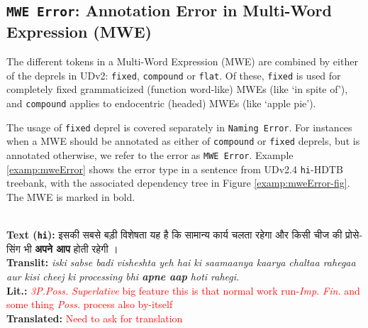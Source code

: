 \subsection[Annotation Error in Multi-Word Expression (MWE): \texttt{MWE Error}]{\texttt{MWE Error}: Annotation Error in Multi-Word Expression (MWE)}

The different tokens in a Multi-Word Expression (MWE) are combined by either of the deprels in UDv2: \texttt{fixed}, \texttt{compound} or \texttt{flat}. Of these, \texttt{fixed} is used for completely fixed grammaticized (function word-like) MWEs (like `in spite of'), and \texttt{compound} applies to endocentric (headed) MWEs (like `apple pie').

The usage of \texttt{fixed} deprel is covered separately in \texttt{Naming Error}. For instances when a MWE should be annotated as either of \texttt{compound} or \texttt{fixed} deprels, but is annotated otherwise, we refer to the error as \texttt{MWE Error}. Example \ref{examp:mweError} shows the error type in a sentence from UDv2.4 \texttt{hi}-HDTB treebank, with the associated dependency tree in Figure \ref{examp:mweError-fig}. The MWE is marked in bold.

\newpage
\begin{example}
\label{examp:mweError}
\textbf{ }\\
\textbf{Text (\texttt{hi}):} \texthindi{इसकी सबसे बड़ी विशेषता यह है कि सामान्य कार्य चलता रहेगा और किसी चीज की प्रोसेसिंग भी \textbf{अपने आप} होती रहेगी ।}\\
\textbf{Translit:} \textit{iski sabse badi visheshta yeh hai ki saamaanya kaarya chaltaa rahegaa aur kisi cheej ki processing bhi \textbf{apne aap} hoti rahegi.}\\
\textbf{Lit.:} \textcolor{red}{\textit{3P.Poss.} \textit{Superlative} big feature this is that normal work run-\textit{Imp.} \textit{Fin.} and some thing \textit{Poss.} process also by-itself}\\
\textbf{Translated:} \textcolor{red}{Need to ask for translation}
\end{example}

